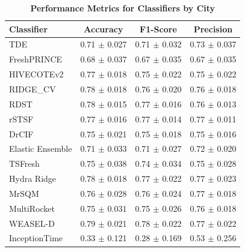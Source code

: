 \documentclass{ieeeaccess}
\begin{document}
\begin{table}[!h]
    \caption{\textbf{Performance Metrics for Classifiers by City}}
    \label{tab:results_city}
    \centering
    \setlength{\tabcolsep}{3pt}
    \begin{tabular}{|l|c|c|c|}
    \hline
    \textbf{Classifier} & \textbf{Accuracy} & \textbf{F1-Score} & \textbf{Precision} \\ 
    \hline
    TDE & 0.71 $\pm$ 0.027 & 0.71 $\pm$ 0.032 & 0.73 $\pm$ 0.037 \\ 
    FreshPRINCE & 0.68 $\pm$ 0.037 & 0.67 $\pm$ 0.035 & 0.67 $\pm$ 0.035 \\ 
    HIVECOTEv2 & 0.77 $\pm$ 0.018 & 0.75 $\pm$ 0.022 & 0.75 $\pm$ 0.022 \\ 
    RIDGE\_CV & 0.78 $\pm$ 0.018 & 0.76 $\pm$ 0.020 & 0.76 $\pm$ 0.018 \\ 
    RDST & 0.78 $\pm$ 0.015 & 0.77 $\pm$ 0.016 & 0.76 $\pm$ 0.013 \\ 
    rSTSF & 0.77 $\pm$ 0.016 & 0.77 $\pm$ 0.014 & 0.77 $\pm$ 0.011 \\ 
    DrCIF & 0.75 $\pm$ 0.021 & 0.75 $\pm$ 0.018 & 0.75 $\pm$ 0.016 \\ 
    Elastic Ensemble & 0.71 $\pm$ 0.033 & 0.71 $\pm$ 0.027 & 0.72 $\pm$ 0.020 \\ 
    TSFresh & 0.75 $\pm$ 0.038 & 0.74 $\pm$ 0.034 & 0.75 $\pm$ 0.028 \\ 
    Hydra Ridge & 0.78 $\pm$ 0.018 & 0.77 $\pm$ 0.022 & 0.77 $\pm$ 0.023 \\ 
    MrSQM & 0.76 $\pm$ 0.028 & 0.76 $\pm$ 0.024 & 0.77 $\pm$ 0.018 \\ 
    MultiRocket & 0.75 $\pm$ 0.031 & 0.75 $\pm$ 0.026 & 0.76 $\pm$ 0.018 \\ 
    WEASEL-D & 0.79 $\pm$ 0.021 & 0.78 $\pm$ 0.022 & 0.77 $\pm$ 0.022 \\ 
    InceptionTime & 0.33 $\pm$ 0.121 & 0.28 $\pm$ 0.169 & 0.53 $\pm$ 0.256 \\ 
    \hline
    \end{tabular}
    \end{table}
    
\end{document}

